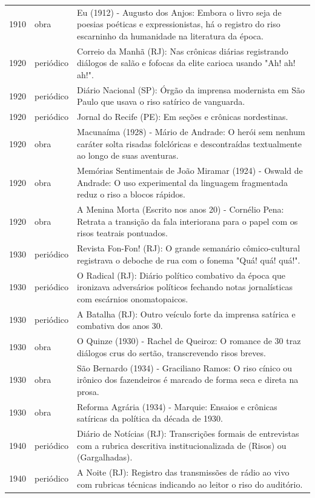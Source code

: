 \begin{longtable}{p{}p{}p{}}
1910 & obra & Eu (1912) - Augusto dos Anjos: Embora o livro seja de poesias poéticas e expressionistas, há o registro do riso escarninho da humanidade na literatura da época. \\
1920 & periódico & Correio da Manhã (RJ): Nas crônicas diárias registrando diálogos de salão e fofocas da elite carioca usando "Ah! ah! ah!". \\
1920 & periódico & Diário Nacional (SP): Órgão da imprensa modernista em São Paulo que usava o riso satírico de vanguarda. \\
1920 & periódico & Jornal do Recife (PE): Em seções e crônicas nordestinas. \\
1920 & obra & Macunaíma (1928) - Mário de Andrade: O herói sem nenhum caráter solta risadas folclóricas e descontraídas textualmente ao longo de suas aventuras. \\
1920 & obra & Memórias Sentimentais de João Miramar (1924) - Oswald de Andrade: O uso experimental da linguagem fragmentada reduz o riso a blocos rápidos. \\
1920 & obra & A Menina Morta (Escrito nos anos 20) - Cornélio Pena: Retrata a transição da fala interiorana para o papel com os risos teatrais pontuados. \\
1930 & periódico & Revista Fon-Fon! (RJ): O grande semanário cômico-cultural registrava o deboche de rua com o fonema "Quá! quá! quá!". \\
1930 & periódico & O Radical (RJ): Diário político combativo da época que ironizava adversários políticos fechando notas jornalísticas com escárnios onomatopaicos. \\
1930 & periódico & A Batalha (RJ): Outro veículo forte da imprensa satírica e combativa dos anos 30. \\
1930 & obra & O Quinze (1930) - Rachel de Queiroz: O romance de 30 traz diálogos crus do sertão, transcrevendo risos breves. \\
1930 & obra & São Bernardo (1934) - Graciliano Ramos: O riso cínico ou irônico dos fazendeiros é marcado de forma seca e direta na prosa. \\
1930 & obra & Reforma Agrária (1934) - Marquie: Ensaios e crônicas satíricas da política da década de 1930. \\
1940 & periódico & Diário de Notícias (RJ): Transcrições formais de entrevistas com a rubrica descritiva institucionalizada de (Risos) ou (Gargalhadas). \\
1940 & periódico & A Noite (RJ): Registro das transmissões de rádio ao vivo com rubricas técnicas indicando ao leitor o riso do auditório. \\

\end{longtable}
